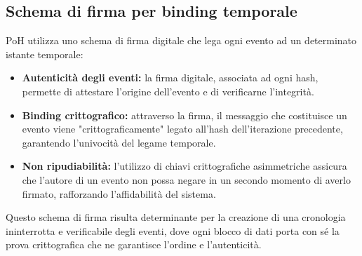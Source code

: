 \documentclass[a4paper,12pt]{report}
\begin{document}
	\subsection{Schema di firma per binding temporale}
	PoH utilizza uno schema di firma digitale che lega ogni evento ad un determinato istante temporale:
	\begin{itemize}
		\item \textbf{Autenticità degli eventi:} la firma digitale, associata ad ogni hash, permette di attestare l’origine dell’evento e di verificarne l’integrità.
		\item \textbf{Binding crittografico:} attraverso la firma, il messaggio che costituisce un evento viene "crittograficamente" legato all'hash dell’iterazione precedente, garantendo l’univocità del legame temporale.
		\item \textbf{Non ripudiabilità:} l’utilizzo di chiavi crittografiche asimmetriche assicura che l’autore di un evento non possa negare in un secondo momento di averlo firmato, rafforzando l’affidabilità del sistema.
	\end{itemize}
	Questo schema di firma risulta determinante per la creazione di una cronologia ininterrotta e verificabile degli eventi, dove ogni blocco di dati porta con sé la prova crittografica che ne garantisce l’ordine e l’autenticità.
	
\end{document}
